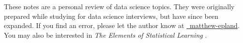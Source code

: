 \preface

These notes are a personal review of data science topics.
They were originally prepared while studying for data science interviews,
but have since been expanded.
If you find an error, please let the author know at
\href{https://www.linkedin.com/in/matthew-epland/}{{\small\faLinkedinSquare}~matthew-epland}.
You may also be interested in \textit{The Elements of Statistical Learning} \cite{HastieTF09}.
